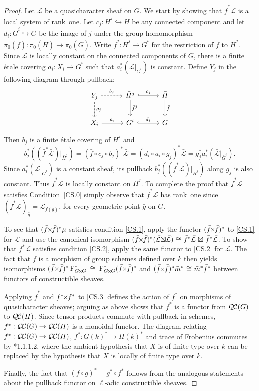 \documentclass[11pt]{amsart}
\theoremstyle{plain}
\theoremstyle{definition}
\theoremstyle{remark}
\newcommand{\Fq}{k}
\newcommand{\Frob}[1]{\operatorname{F}_{#1}}
\newcommand{\iso}{{\ \cong\ }}
\newcommand{\qcs}[1]{{\mathcal{#1}}}
\newcommand{\gqcs}[1]{{\mathcal{\bar #1}}}
\newcommand{\QC}{{\mathcal{Q\hskip-0.8pt C}}}
\renewcommand{\bf}{\bar{f}}
\newcommand{\bg}{\bar{g}}
\newcommand{\bm}{\bar{m}}
\newcommand{\bG}{\bar{G}}
\newcommand{\bH}{\bar{H}}
\newcommand{\tight}[3]{\hspace{-#1pt}{#2}\hspace{-#3pt}}
\newcommand{\bfxf}{\text{$\bar{f} \tight{1}{\times}{1} \bar{f}$}}
\newcommand{\GxxG}{\text{$G \tight{1}{\times}{1} G$}}
\newcommand{\LxL}{\text{$\gqcs{L} \tight{0}{\boxtimes}{0} \gqcs{L}$}}
\begin{document}
\begin{proof}
  Let $\qcs{L}$ be a quasicharacter sheaf on $G$. We start by showing that
  $\bf^*\gqcs{L}$ is a local system of rank~one. Let $c_j :\bH^j \hookrightarrow \bH$ be any
  connected component and let $d_i : \bG^i \hookrightarrow \bG$ be the image of $j$ under the group
  homomorphism $\pi_0(\bf) : \pi_0(\bH) \to \pi_0(\bG)$.  Write $\bf^j : \bH^j \to \bG^i$
  for the restriction of $f$ to $\bH^j$.  Since $\gqcs{L}$ is locally constant on the connected
  components of $\bG$, there is a finite \'etale covering
  $a_i : X_i \to \bG^i$ such that $a_i^* (\gqcs{L}\vert_{\bG^i})$
  is constant.  Define $Y_j$ in the following diagram through pullback:
  \[
  \begin{tikzcd}[row sep=20, column sep=30]
   Y_j \dar[dashed]{g_j} \rar[dashed]{b_j} & \bH^j \dar{\bf^j} \rar[hook]{c_j} & \bH \dar{\bf} \\
   X_i \rar{a_i} & \bG^i \rar[hook]{d_i} & \bG
  \end{tikzcd}
  \]
  Then $b_j$ is a finite \'etale covering
  of $\bH^j$ and
  \[
  b_j^* \left( (\bf^* \gqcs{L})\vert_{\bH^j}\right)
  = (\bf\circ c_j \circ b_j)^*\gqcs{L}
  = (d_i\circ a_i\circ g_j)^*\gqcs{L} = g_j^* a_i^* (\gqcs{L}\vert_{\bG^i}).
  \]
%
  Since $a_i^* (\gqcs{L}\vert_{\bG^i})$ is a constant sheaf, its pullback
  $b_j^* \left( (\bf^*\gqcs{L})\vert_{\bH^j}\right)$ along $g_j$ is also constant.
  Thus $\bf^*\gqcs{L}$ is locally constant on
  $\bH^j$. To complete the proof that $\bf^*\gqcs{L}$ satisfies Condition~\ref{CS.0}
  simply observe that $\bf^*\gqcs{L}$ has rank~one since 
  $(\bf^*\gqcs{L})_{\bg} = \gqcs{L}_{f(\bg)}$, for every geometric point ${\bg}$ on $\bG$.
  

  To see that $(\bfxf)^* \mu$ satisfies
  condition \ref{CS.1}, apply the functor $(\bfxf)^*$
  to \ref{CS.1} for $\qcs{L}$ and use the canonical isomorphism
  $(\bfxf)^*(\LxL) \iso \bf^*\gqcs{L} \tight{-3}{\boxtimes}{-3} \bf^*\gqcs{L}$.
  To show that $f^*\qcs{L}$ satisfies condition
  \ref{CS.2}, apply the same functor to \ref{CS.2} for $\qcs{L}$.
  The fact that $f$ is a morphism of group schemes defined over $\Fq$ then
  yields isomorphisms $(\bfxf)^*\Frob{\GxxG}^* \iso \Frob{\GxxG}^* (\bfxf)^*$
  and $(\bfxf)^* \bm^*\iso \bm^* \bf^*$ between functors of constructible sheaves.
  
  Applying $\bf^*$ and $\bf^* \tight{1}{\times}{1}\bf^*$ to \ref{CS.3} defines the action
  of $f^*$ on morphisms of quasicharacter sheaves; arguing as above shows that $f^*$ is
  a functor from $\QC(G)$ to $\QC(H)$.  Since tensor products commute with pullback in schemes,
  $f^* : \QC(G) \to \QC(H)$ is a monoidal functor.
%
  The diagram relating $f^* : \QC(G) \to \QC(H)$, $f^* : G(k)^* \to H(k)^*$ and trace of Frobenius
  commutes by \cite{laumon:87a}*{1.1.1.2}, where the ambient
  hypothesis that $X$ is of finite type over $\Fq$ can be replaced by
  the hypothesis that $X$ is locally of finite type over $\Fq$.
  
  Finally, the fact that $(f\circ g)^* = g^* \circ f^*$ follows from the analogous
  statements about the pullback functor on $\ell$-adic constructible sheaves.
\end{proof}
\end{document}
